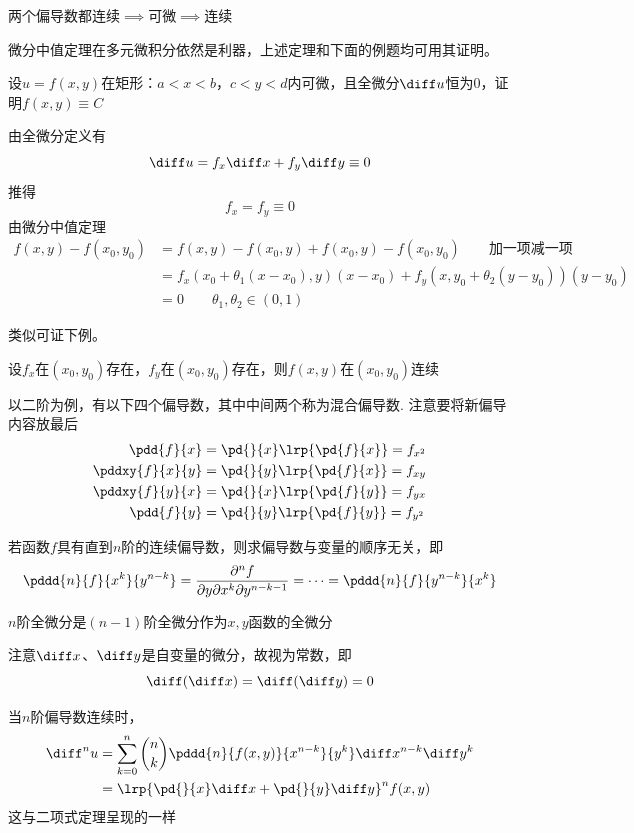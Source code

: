 \begin{theorem}
两个偏导数都连续$\implies$可微$\implies$连续
\end{theorem}
微分中值定理在多元微积分依然是利器，上述定理和下面的例题均可用其证明。
\begin{example}
设$u=f(x,y)$在矩形：$a<x<b$，$c<y<d$内可微，且全微分$\diff u$恒为$0$，证明$f(x,y)\equiv C$
\end{example}
\begin{analysis}
由全微分定义有
\[\diff u=f_x\diff x+f_y\diff y\equiv 0\]
推得
\[f_x=f_y\equiv 0\]
由微分中值定理
\[\begin{aligned}
f(x,y)-f(x_0,y_0)&=f(x,y)-f(x_0,y)+f(x_0,y)-f(x_0,y_0)\qquad\mbox{加一项减一项}\\
&=f_x(x_0+\theta_1(x-x_0),y)(x-x_0)+f_y(x,y_0+\theta_2(y-y_0))(y-y_0)\\
&=0\qquad\theta_1,\theta_2\in(0,1)
\end{aligned}\]
\end{analysis}
类似可证下例。
\begin{example}
设$f_x$在$(x_0,y_0)$存在，$f_y$在$(x_0,y_0)$存在，则$f(x,y)$在$(x_0,y_0)$连续
\end{example}
\begin{definition}[高阶偏导数]
以二阶为例，有以下四个偏导数，其中中间两个称为混合偏导数. 注意要将新偏导内容放最后
\[\begin{aligned}
\pdd{f}{x}&=\pd{}{x}\lrp{\pd{f}{x}}=f_{x^2}\\
\pddxy{f}{x}{y}&=\pd{}{y}\lrp{\pd{f}{x}}=f_{xy}\\
\pddxy{f}{y}{x}&=\pd{}{x}\lrp{\pd{f}{y}}=f_{yx}\\
\pdd{f}{y}&=\pd{}{y}\lrp{\pd{f}{y}}=f_{y^2}
\end{aligned}\]
\end{definition}
\begin{theorem}[混合偏导数相等]
若函数$f$具有直到$n$阶的连续偏导数，则求偏导数与变量的顺序无关，即
\[\pddd{n}{f}{x^k}{y^{n-k}}=\dfrac{\partial^n f}{\partial y\partial x^k\partial y^{n-k-1}}=\cdots=\pddd{n}{f}{y^{n-k}}{x^{k}}\]
\end{theorem}
$n$阶全微分是$(n-1)$阶全微分作为$x,y$函数的全微分
\par 注意$\diff x$、$\diff y$是自变量的微分，故视为常数，即
\[\diff(\diff x)=\diff(\diff y)=0\]
\begin{theorem}[高阶全微分]
当$n$阶偏导数连续时，
\[\begin{aligned}
\diff^n u&=\sum_{k=0}^n\binom{n}{k}\pddd{n}{f(x,y)}{x^{n-k}}{y^k}\diff x^{n-k}\diff y^k\\
&=\lrp{\pd{}{x}\diff x+\pd{}{y}\diff y}^n f(x,y)
\end{aligned}\]
这与二项式定理呈现的一样
\end{theorem}

